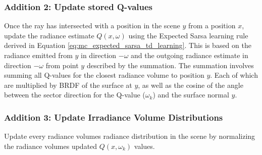 \documentclass[../dissertation.tex]{subfiles}
\begin{document}
\subsubsection*{Addition 2: Update stored Q-values}
Once the ray has intersected with a position in the scene $y$ from a position $x$, update the radiance estimate $Q(x, \omega)$ using the Expected Sarsa learning rule derived in Equation \ref{eq:mc_expected_sarsa_td_learning}. This is based on the radiance emitted from $y$ in direction $-\omega$ and the outgoing radiance estimate in direction $-\omega$ from point $y$ described by the summation. The summation involves summing all Q-values for the closest radiance volume to position $y$. Each of which are multiplied by BRDF of the surface at $y$, as well as the cosine of the angle between the sector direction for the Q-value ($\omega_k$) and the surface normal $y$.

\subsubsection*{Addition 3: Update Irradiance Volume Distributions}
Update every radiance volumes radiance distribution in the scene by normalizing the radiance volumes updated $Q(x, \omega_k)$ values. 
\end{document}
